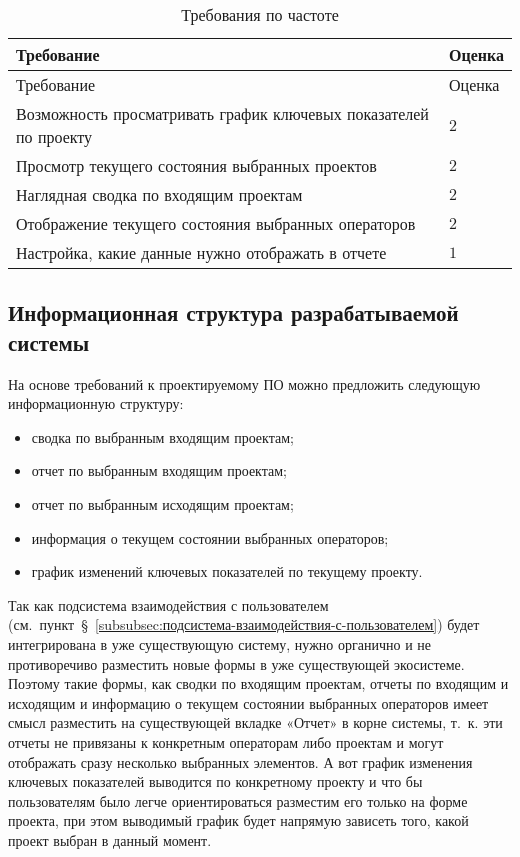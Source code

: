 \begin{small}
\begin{longtable}{|p{}|p{}|}
\caption{Требования по частоте}
\label{tab:req:frequency}
\\ \hline
Требование                          & Оценка \\
\hline \endfirsthead
\hline
Требование                          & Оценка \\
\hline
\endhead
\hline \endlastfoot
Возможность просматривать график ключевых показателей по проекту & $2$  \\
\hline
Просмотр текущего состояния выбранных проектов          & $2$    \\
\hline
Наглядная сводка по входящим проектам               & $2$ \\
\hline
Отображение текущего состояния выбранных операторов              & $2$ \\
\hline
Настройка, какие данные нужно отображать в отчете              & $1$ \\
\end{longtable}
\end{small}

\subsection{Информационная структура разрабатываемой системы}
\label{subsec:информационная-структура-разрабатываемой-системы}

На основе требований к проектируемому ПО можно предложить следующую информационную структуру:
\begin{itemize}
    \item сводка по выбранным входящим проектам;
    \item отчет по выбранным входящим проектам;
    \item отчет по выбранным исходящим проектам;
    \item информация о текущем состоянии выбранных операторов;
    \item график изменений ключевых показателей по текущему проекту.
\end{itemize}

Так как подсистема взаимодействия с пользователем (см.~пункт~\S~\ref{subsubsec:подсистема-взаимодействия-с-пользователем})
будет интегрирована в уже существующую систему,
нужно органично и не противоречиво разместить новые формы в уже существующей экосистеме.
Поэтому такие формы, как сводки по входящим проектам,
отчеты по входящим и исходящим
и информацию о текущем состоянии выбранных операторов имеет смысл разместить на существующей вкладке
«Отчет» в корне системы,
т.~к. эти отчеты не привязаны к конкретным операторам либо проектам и могут
отображать сразу несколько выбранных элементов.
А вот график изменения ключевых
показателей выводится по конкретному проекту и что бы пользователям было легче
ориентироваться разместим его только на форме проекта,
при этом выводимый график будет напрямую зависеть того,
какой проект выбран в данный момент.

